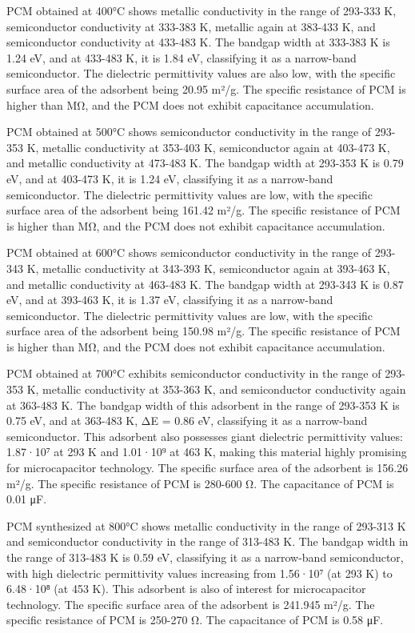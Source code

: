 PCM obtained at 400°C shows metallic conductivity in the range of
293-333 K, semiconductor conductivity at 333-383 K, metallic again at
383-433 K, and semiconductor conductivity at 433-483 K. The bandgap
width at 333-383 K is 1.24 eV, and at 433-483 K, it is 1.84 eV,
classifying it as a narrow-band semiconductor. The dielectric
permittivity values are also low, with the specific surface area of the
adsorbent being 20.95 m²/g. The specific resistance of PCM is higher
than MΩ, and the PCM does not exhibit capacitance accumulation.

PCM obtained at 500°C shows semiconductor conductivity in the range of
293-353 K, metallic conductivity at 353-403 K, semiconductor again at
403-473 K, and metallic conductivity at 473-483 K. The bandgap width at
293-353 K is 0.79 eV, and at 403-473 K, it is 1.24 eV, classifying it as
a narrow-band semiconductor. The dielectric permittivity values are low,
with the specific surface area of the adsorbent being 161.42 m²/g. The
specific resistance of PCM is higher than MΩ, and the PCM does not
exhibit capacitance accumulation.

PCM obtained at 600°C shows semiconductor conductivity in the range of
293-343 K, metallic conductivity at 343-393 K, semiconductor again at
393-463 K, and metallic conductivity at 463-483 K. The bandgap width at
293-343 K is 0.87 eV, and at 393-463 K, it is 1.37 eV, classifying it as
a narrow-band semiconductor. The dielectric permittivity values are low,
with the specific surface area of the adsorbent being 150.98 m²/g. The
specific resistance of PCM is higher than MΩ, and the PCM does not
exhibit capacitance accumulation.

PCM obtained at 700°C exhibits semiconductor conductivity in the range
of 293-353 K, metallic conductivity at 353-363 K, and semiconductor
conductivity again at 363-483 K. The bandgap width of this adsorbent in
the range of 293-353 K is 0.75 eV, and at 363-483 K, ΔE = 0.86 eV,
classifying it as a narrow-band semiconductor. This adsorbent also
possesses giant dielectric permittivity values: 1.87·10⁷ at 293 K and
1.01·10⁹ at 463 K, making this material highly promising for
microcapacitor technology. The specific surface area of the adsorbent is
156.26 m²/g. The specific resistance of PCM is 280-600 Ω. The
capacitance of PCM is 0.01 μF.

PCM synthesized at 800°C shows metallic conductivity in the range of
293-313 K and semiconductor conductivity in the range of 313-483 K. The
bandgap width in the range of 313-483 K is 0.59 eV, classifying it as a
narrow-band semiconductor, with high dielectric permittivity values
increasing from 1.56·10⁷ (at 293 K) to 6.48·10⁸ (at 453 K). This
adsorbent is also of interest for microcapacitor technology. The
specific surface area of the adsorbent is 241.945 m²/g. The specific
resistance of PCM is 250-270 Ω. The capacitance of PCM is 0.58 μF.

